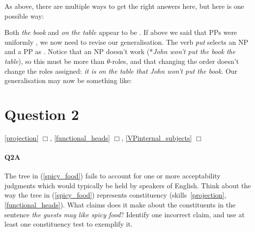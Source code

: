 \documentclass{article}
\begin{document}
\begin{answer}
{
As above, there are multiple ways to get the right answers here, but here is one possible way:
\begin{exe}
\end{exe}
Both \emph{the book} and \emph{on the table} appear to be .
If above we said that PPs were uniformly , we now need to revise our generalisation.
The verb \emph{put} selects an NP  and a PP  as .
Notice that an NP  doesn't work (*\emph{John won't put the book the table}), so this must be more than $\theta{}$-roles, and that changing the order doesn't change the roles assigned: \emph{it is on the table that John won't put the book}.
Our generalisation may now be something like:
\begin{exe}
\end{exe}   }
\end{answer}

\section*{Question 2}
\hfill{} \ref{projection} $\Box$, \ref{functional_heads} $\Box$, \ref{VPinternal_subjects} $\Box$

\paragraph{Q2A} The tree in (\ref{spicy_food}) fails to account for one or more acceptability judgments which would typically be held by speakers of English.
Think about the way the tree in (\ref{spicy_food}) represents constituency (skills~\ref{projection}, \ref{functional_heads}).
What claims does it make about the constituents in the sentence \emph{the guests may like spicy food}? Identify one incorrect claim, and use at least one constituency test to exemplify it.
\end{document}
